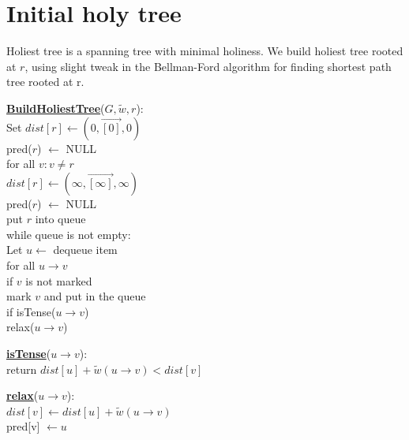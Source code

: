 \documentclass{article}
\begin{document}
\section{Initial holy tree}
Holiest tree is a spanning tree with minimal holiness. We build holiest tree 
rooted at $r$, using slight tweak in the Bellman-Ford algorithm for finding 
shortest path tree rooted at r. \\

\begin{minipage}[t]{0.48\linewidth}
\begin{algorithm}
\textbf{\underline{BuildHoliestTree}}($G, \tilde w , r$): \\ \quad
Set $dist[r] \leftarrow ( 0, \vec{[0]}, 0 )$ \\ \quad \quad
    pred($r$) $\leftarrow$ NULL \\ \quad
for all $v : v \neq r$ \\ \quad \quad
    $dist[r] \leftarrow ( \infty, \vec{[\infty]}, \infty )$ \\ \quad \quad
    pred($r$) $\leftarrow$ NULL \\ \quad
put $r$ into queue \\ \quad
while queue is not empty: \\ \quad \quad
    Let $u \leftarrow$ dequeue item \\ \quad \quad
    for all $u \rightarrow v$ \\ \qquad \quad
        if $v$ is not marked \\ \quad \qquad \quad
           mark $v$ and put in the queue \\ \qquad \quad
        if isTense($u \rightarrow v$) \\ \quad \qquad \quad
           relax($u \rightarrow v$)
\end{algorithm}
\end{minipage}
\hfill%
\hspace{-4cm}
\begin{minipage}[t]{0.48\linewidth}
\begin{algorithm}
\textbf{\underline{isTense}}($u \rightarrow v$): \\ \quad
return $dist[u] + \tilde w(u \rightarrow v) < dist[v]$ \\

\end{algorithm}

\vspace{0.5cm}

\begin{algorithm}
\textbf{\underline{relax}}($u \rightarrow v$): \\ \quad
$dist[v] \leftarrow dist[u] + \tilde w(u \rightarrow v)$ \\ \quad
pred[v] $\leftarrow u$ \\
\end{algorithm}
\end{minipage}
\end{document}
